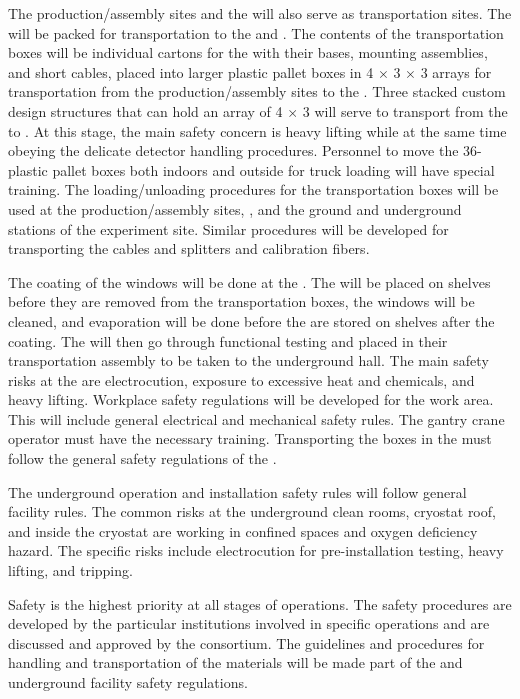 The production/assembly sites and the  will also serve as transportation sites. The  will be packed for transportation to the  and \surf. The contents of the transportation boxes will be individual cartons for the  with their bases, mounting assemblies, and short cables, placed into larger plastic pallet boxes in \num{4} $\times$ \num{3} $\times$ \num{3} arrays for transportation from the production/assembly sites to the . Three stacked custom design structures that can hold an array of \num{4} $\times$ \num{3}  will serve to transport  from the  to \surf. At this stage, the main safety concern is heavy lifting while at the same time obeying the delicate detector handling procedures. Personnel to move the \num{36}- plastic pallet boxes both indoors and outside for truck loading will have special training. The loading/unloading procedures for the  transportation boxes will be used at the production/assembly sites, , and the ground and underground stations of the experiment site. Similar procedures will be developed for transporting the  cables and splitters and calibration fibers.

The  coating of the  windows will be done at the . The  will be placed on shelves before they are removed from the transportation boxes, the windows will be cleaned, and  evaporation will be done before the  are stored on shelves after the coating. The  will then go through functional testing and placed in their transportation assembly to be taken to the underground hall. The main safety risks at the  are electrocution, exposure to excessive heat and chemicals, and heavy lifting. Workplace safety regulations will be developed for the  \dual {} work area. This will include general electrical and mechanical safety rules. The gantry crane operator must have the necessary training. Transporting the  boxes in the  must follow the general safety regulations of the .

The underground operation and installation safety rules will follow general facility rules. The common risks at the underground clean rooms, cryostat roof, and inside the cryostat are working in confined spaces and oxygen deficiency hazard. The \dual {} specific risks include electrocution for pre-installation testing, heavy lifting, and tripping.

Safety is the highest priority at all stages of \dual {} operations. The safety procedures are developed by the particular institutions involved in specific operations and are discussed and approved by the consortium. The guidelines and procedures for handling and transportation of the \dual {} materials will be made part of the  and underground facility safety regulations.








